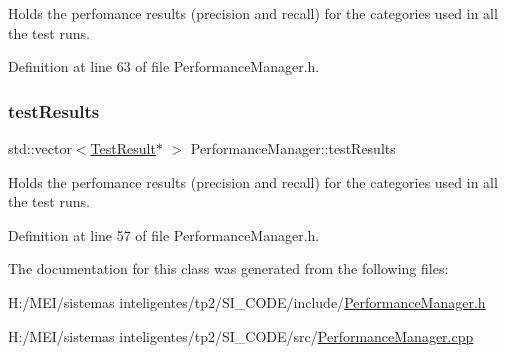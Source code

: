 Holds the perfomance results (precision and recall) for the categories used in all the test runs. 

Definition at line 63 of file Performance\+Manager.\+h.

\mbox{\label{class_performance_manager_ad456304b0437d5dac639f622f33dbabe}} 
\subsubsection{\texorpdfstring{test\+Results}{testResults}}
{\footnotesize\ttfamily std\+::vector$<$\hyperlink{class_test_result}{Test\+Result}$\ast$ $>$ Performance\+Manager\+::test\+Results\hspace{0.3cm}{\ttfamily [protected]}}

Holds the perfomance results (precision and recall) for the categories used in all the test runs. 

Definition at line 57 of file Performance\+Manager.\+h.



The documentation for this class was generated from the following files\+:\begin{DoxyCompactItemize}
\item 
H\+:/\+M\+E\+I/sistemas inteligentes/tp2/\+S\+I\+\_\+\+C\+O\+D\+E/include/\hyperlink{_performance_manager_8h}{Performance\+Manager.\+h}\item 
H\+:/\+M\+E\+I/sistemas inteligentes/tp2/\+S\+I\+\_\+\+C\+O\+D\+E/src/\hyperlink{_performance_manager_8cpp}{Performance\+Manager.\+cpp}\end{DoxyCompactItemize}
